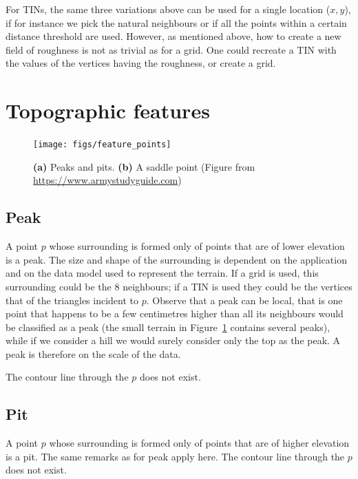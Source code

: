 %

For TINs, the same three variations above can be used for a single location ($x,y$), if for instance we pick the natural neighbours or if all the points within a certain distance threshold are used.
However, as mentioned above, how to create a new field of roughness is not as trivial as for a grid.
One could recreate a TIN with the values of the vertices having the roughness, or create a grid.




%
\section{Topographic features}

\begin{figure}
  \centering
  \texttt{[image: figs/feature\_points]}
  \caption{\textbf{(a)} Peaks and pits. \textbf{(b)} A saddle point (Figure from \url{https://www.armystudyguide.com})}%
\label{fig:feature_points}
\end{figure}


\subsection{Peak}
A point $p$ whose surrounding is formed only of points that are of lower elevation is a peak.
The size and shape of the surrounding is dependent on the application and on the data model used to represent the terrain.
If a grid is used, this surrounding could be the 8 neighbours; if a TIN is used they could be the vertices that of the triangles incident to $p$.
Observe that a peak can be local,%
that is one point that happens to be a few centimetres higher than all its neighbours would be classified as a peak (the small terrain in Figure~\ref{fig:feature_points} contains several peaks), while if we consider a hill we would surely consider only the top as the peak.
A peak is therefore on the scale of the data.

The contour line through the $p$ does not exist.

\subsection{Pit}
A point $p$ whose surrounding is formed only of points that are of higher elevation is a pit.
The same remarks as for peak apply here.
The contour line through the $p$ does not exist.

